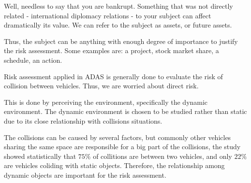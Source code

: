 Well, needless to say that you are bankrupt. Something that was not directly related - international diplomacy relations - to your subject can affect dramatically its value. We can refer to the subject as assets, or future assets.

Thus, the subject can be anything with enough degree of importance to justify the risk assessment. Some examples are: a project, stock market share, a schedule, an action.

Risk assessment applied in ADAS is generally done to evaluate the risk of collision between vehicles. Thus, we are worried about direct risk. 

This is done by perceiving the environment, specifically the dynamic environment. The dynamic environment is chosen to be studied rather than static due to its close relationship with  collisions situations. 

The collisions can be caused by several factors, but commonly other vehicles sharing the same space are responsible for a big part of the collisions, the study \cite{Hurt_1981} showed statistically that $75\%$ of collitions are between two vehicles, and only $22\%$ are vehicles coliding with static objects. Therefore, the relationship among dynamic objects are important for the risk assessment.
